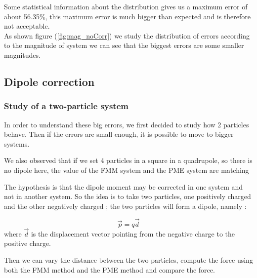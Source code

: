 \documentclass[12pt,twoside,a4paper]{report}
\begin{document}
	Some statistical information about the distribution gives us a maximum error of about 56.35\%, this maximum error is much bigger than expected and is therefore not acceptable.\\
	
	As shown figure (\ref{fig:mag_noCorr}) we study the distribution of errors according to the magnitude of system we can see that the biggest errors are some smaller magnitudes.
	

	
\subsection{Dipole correction}
\subsubsection{Study of a two-particle system}
	In order to understand these big errors, we first decided to study how 2 particles behave. Then if the errors are small enough, it is possible to move to bigger systems.
	
We also observed that if we set 4 particles in a square in a quadrupole, so there is no dipole here, the value of the FMM system and the PME system are matching




 	
	
The hypothesis is that the dipole moment may be corrected in one system and not in another system. So the idea is to take two particles, one positively charged and the other negatively charged ; the two particles will form a dipole, namely : 

\begin{equation}
	\vec{p} = q \vec{d}
\end{equation}	
	where $\vec{d}$ is the displacement vector pointing from the negative charge to the positive charge. 
	
	Then we can vary the distance between the two particles, compute the force using both the FMM method and the PME method and compare the force.
	
\end{document}
